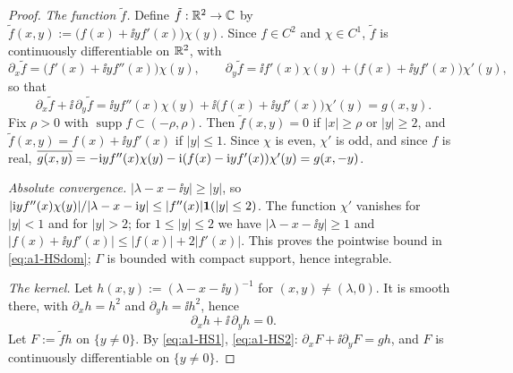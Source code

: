 \begin{proof}
\emph{The function $\tilde f$.} Define $\tilde f:\mathbb{R}^2\to\mathbb{C}$ by $\tilde f(x,y):=\big(f(x)+\ii yf'(x)\big)\chi(y)$. Since $f\in C^2$ and $\chi\in C^1$, $\tilde f$ is continuously differentiable on $\mathbb{R}^2$, with
\[
 \partial_x\tilde f=\big(f'(x)+\ii yf''(x)\big)\chi(y),\qquad\partial_y\tilde f=\ii f'(x)\chi(y)+\big(f(x)+\ii yf'(x)\big)\chi'(y),
\]
so that
\begin{equation}\tag{HS1}\label{eq:a1-HS1}
 \partial_x\tilde f+\ii\,\partial_y\tilde f=\ii yf''(x)\chi(y)+\ii\big(f(x)+\ii yf'(x)\big)\chi'(y)=g(x,y).
\end{equation}
Fix $\rho>0$ with $\operatorname{supp}f\subset(-\rho,\rho)$. Then $\tilde f(x,y)=0$ if $|x|\ge\rho$ or $|y|\ge2$, and $\tilde f(x,y)=f(x)+\ii yf'(x)$ if $|y|\le1$.
Since $\chi$ is even, $\chi'$ is odd, and since $f$ is real, $\overline{g(x,y)}=-\mathrm{i} yf''(x)\chi(y)-\mathrm{i}(f(x)-\mathrm{i} yf'(x))\chi'(y)=g(x,-y)$.

\emph{Absolute convergence.} $|\lambda-x-\ii y|\ge|y|$, so $|\mathrm{i} yf''(x)\chi(y)|/|\lambda-x-\mathrm{i} y|\le|f''(x)|\mathbf{1}(|y|\le2)$. The function $\chi'$ vanishes for $|y|<1$ and for $|y|>2$; for $1\le|y|\le2$ we have $|\lambda-x-\ii y|\ge1$ and
$|f(x)+\ii yf'(x)|\le|f(x)|+2|f'(x)|$. This proves the pointwise bound in \eqref{eq:a1-HSdom}; $\Gamma$ is bounded with compact support, hence integrable.

\emph{The kernel.} Let $h(x,y):=(\lambda-x-\ii y)^{-1}$ for $(x,y)\ne(\lambda,0)$. It is smooth there, with $\partial_xh=h^2$ and $\partial_yh=\ii h^2$, hence
\begin{equation}\tag{HS2}\label{eq:a1-HS2}
 \partial_xh+\ii\,\partial_yh=0 .
\end{equation}
Let $F:=\tilde fh$ on $\{y\ne0\}$. By \eqref{eq:a1-HS1}, \eqref{eq:a1-HS2}: $\partial_xF+\ii\partial_yF=gh$, and $F$ is continuously differentiable on $\{y\ne0\}$.


\end{proof}
